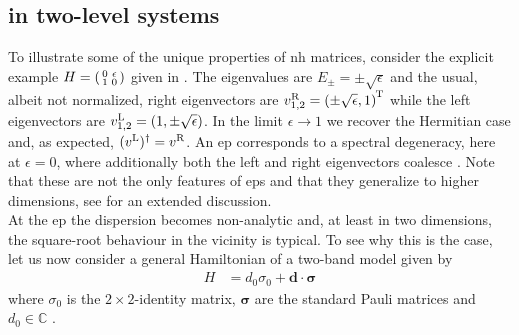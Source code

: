 \subsection{\texorpdfstring{}{EP} in two-level systems}\label{sec:ep:eps}
To illustrate some of the unique properties of \gls{nh} matrices, consider the explicit example $H = \begin{psmallmatrix}
0&\epsilon \\ 1&0
\end{psmallmatrix}$ given in \cite{ExceptTop_RevModPhys.93.015005}.
The eigenvalues are $E_\pm = \pm \sqrt{\epsilon}$ and the usual, albeit not normalized, right eigenvectors are $v^\R_{1,2} = \kla*{\pm\sqrt{\epsilon}, 1}^\transpose$ while the left eigenvectors are $v^\L_{1,2} = \kla*{1, \pm\sqrt{\epsilon}}$.
In the limit $\epsilon\rightarrow 1$ we recover the Hermitian case and, as expected, $\kla{v^\L}^\dagger = v^\R$.
An \gls{ep} corresponds to a spectral degeneracy, here at $\epsilon=0$, where additionally both the left and right eigenvectors coalesce \cite[]{EP_Physics_Heiss_2012}.
Note that these are not the only features of \glspl{ep} and that they generalize to higher dimensions, see \cite{ExceptTop_RevModPhys.93.015005} for an extended discussion.\\
At the \gls{ep} the dispersion becomes non-analytic and, at least in two dimensions, the square-root behaviour in the vicinity is typical.
To see why this is the case, let us now consider a general Hamiltonian of a two-band model given by
\begin{align*}
H &= d_0 \sigma_0 + \textbf{d}\cdot \bm{\sigma}
\end{align*}
where $\sigma_0$ is the $2\times 2$-identity matrix, $\bm{\sigma}$ are the standard Pauli matrices and $d_0\in\mathbb{C}$ \cite{NHT_SymmetryProtectedNodalPhases_Budich_2019}.
